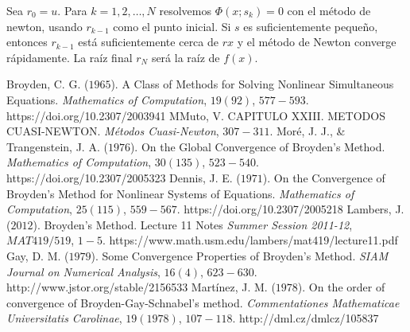 \documentclass[12pt]{article}
\begin{document}
Sea $r_0 = u$.
Para $k = 1, 2, \ldots, N$ resolvemos $\Phi(x;s_k) = 0$ con el método de newton, usando $r_{k-1}$ como el punto inicial.
Si $s$ es suficientemente pequeño, entonces $r_{k-1}$ está suficientemente cerca de $rx$ y el método de Newton converge rápidamente.
La raíz final $r_N$ será la raíz de $f(x)$.

\newpage
{}

\begin{thebibliography}{99}
	Broyden, C. G. ($1965$). A Class of Methods for Solving Nonlinear Simultaneous Equations. \textit{Mathematics of Computation}, $19(92)$, $577-593$. https://doi.org/10.2307/2003941
	MMuto, V. CAPITULO XXIII. METODOS CUASI-NEWTON. \textit{Métodos Cuasi-Newton}, $307-311$.
	Moré, J. J., \& Trangenstein, J. A. ($1976$). On the Global Convergence of Broyden’s Method. \textit{Mathematics of Computation}, $30(135)$, $523-540$. https://doi.org/10.2307/2005323
	Dennis, J. E. ($1971$). On the Convergence of Broyden’s Method for Nonlinear Systems of Equations. \textit{Mathematics of Computation}, $25(115)$, $559-567$. https://doi.org/10.2307/2005218
	Lambers, J. ($2012$). Broyden’s Method. Lecture 11 Notes \textit{Summer Session 2011-12}, $MAT 419/519$, $1-5$. https://www.math.usm.edu/lambers/mat419/lecture11.pdf
	Gay, D. M. ($1979$). Some Convergence Properties of Broyden’s Method. \textit{SIAM Journal on Numerical Analysis}, $16(4)$, $623-630$. http://www.jstor.org/stable/2156533
	Martínez, J. M. ($1978$). On the order of convergence of Broyden-Gay-Schnabel's method. \textit{Commentationes Mathematicae Universitatis Carolinae}, $19(1978)$, $107-118$. http://dml.cz/dmlcz/105837
\end{thebibliography}
\end{document}
